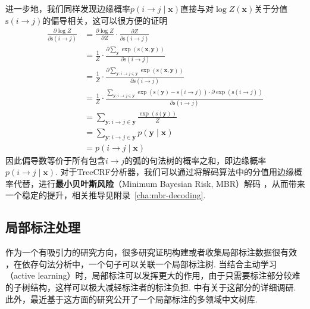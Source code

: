 进一步地，我们同样发现边缘概率$p(i \rightarrow j\mid\boldsymbol{x})$直接与对$\log Z(\boldsymbol{x})$关于分值$\mathrm{s}(i\rightarrow j)$的偏导相关，这可以很方便的证明
\begin{equation}
  \label{eq:dep-partial-derivative}
  \begin{split}
    \frac{\partial \log Z}{\partial \mathrm{s}(i\rightarrow j)}
    & = \frac{\partial \log Z}{\partial Z} \cdot \frac{\partial Z}{\partial \mathrm{s}(i\rightarrow j)}\\
    & =\frac{1}{Z} \cdot \frac{\partial \sum_{\boldsymbol{y}} \exp \left(\mathrm{s}(\boldsymbol{x}, \boldsymbol{y}) \right)}{\partial \mathrm{s}(i\rightarrow j)}\\
    & =\frac{1}{Z} \cdot \frac{\partial \sum_{\boldsymbol{y}:i\rightarrow j \in \boldsymbol{{y}}} \exp \left(\mathrm{s}(\boldsymbol{x}, \boldsymbol{y}) \right)}{\partial \mathrm{s}(i\rightarrow j)}\\
    & =\frac{1}{Z} \cdot \frac{\sum_{\boldsymbol{y}:i\rightarrow j \in \boldsymbol{{y}}} \exp \left( \mathrm{s}(\boldsymbol{y}) -\mathrm{s}(i\rightarrow j)  \right)\cdot \partial \exp(\mathrm{s}(i\rightarrow j))}{\partial \mathrm{s}(i\rightarrow j)}\\
    & =\sum_{\boldsymbol{y}:i\rightarrow j \in \boldsymbol{{y}}} \frac{\exp \left( \mathrm{s}(\boldsymbol{y})\right)}{Z}\\
    &= \sum_{\boldsymbol{y}:i\rightarrow j \in \boldsymbol{{y}}} p(\boldsymbol{y}\mid\boldsymbol{x})\\
    &= p(i \rightarrow j\mid\boldsymbol{x})
  \end{split}
\end{equation}
因此偏导数等价于所有包含$i \rightarrow j$的弧的句法树的概率之和，即边缘概率$p(i \rightarrow j\mid\boldsymbol{x})$.
对于TreeCRF分析器，我们可以通过将解码算法中的分值用边缘概率代替，进行\textbf{最小贝叶斯风险}（Minimum Bayesian Risk, MBR）解码 \citep{smith-smith-2007-probabilistic}，从而带来一个稳定的提升，相关推导见附录~\ref{cha:mbr-decoding}.

\subsection{局部标注处理}
\label{sub@sec:partial-annotation}

作为一个有吸引力的研究方向，很多研究证明构建或者收集局部标注数据很有效 \citep{nivre-etal-2014-squibs,hwa-1999-supervised,pereira-schabes-1992-inside-outside}，在依存句法分析中，一个句子可以关联一个局部标注树.
当结合主动学习（active learning）时，局部标注可以发挥更大的作用，由于只需要标注部分较难的子树结构，这样可以极大减轻标注者的标注负担.
\citet{li-etal-2016-active}中有关于这部分的详细调研.
此外，\citet{peng-etal-2019-overview}最近基于这方面的研究公开了一个局部标注的多领域中文树库.

